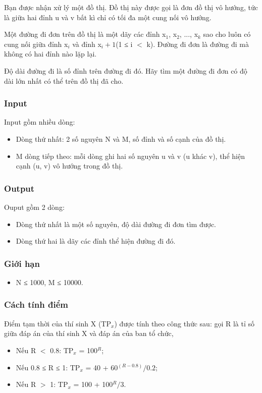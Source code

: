 

Bạn được nhận xử lý một đồ thị. Đồ thị này được gọi là đơn đồ thị vô hướng, tức là giữa hai đỉnh u và v bất kì chỉ có tối đa một cung nối vô hướng.

Một đường đi đơn trên đồ thị là một dãy các đỉnh x$_1$, x$_2$, ..., x$_k$ sao cho luôn có cung nối giữa đỉnh x$_i$ và đỉnh x$_i + 1$(1 ≤ i $<$ k). Đường đi đơn là đường đi mà không có hai đỉnh nào lặp lại.

Độ dài đường đi là số đỉnh trên đường đi đó. Hãy tìm một đường đi đơn có độ dài lớn nhất có thể trên đồ thị đã cho.

\subsubsection{Input}

Input gồm nhiều dòng:
\begin{itemize}
	\item Dòng thứ nhất: 2 số nguyên N và M, số đỉnh và số cạnh của đồ thị. 
	\item M dòng tiếp theo: mỗi dòng ghi hai số nguyên u và v (u khác v), thể hiện cạnh (u, v) vô hướng trong đồ thị.
\end{itemize}

\subsubsection{Output}

Ouput gồm 2 dòng:
\begin{itemize}
	\item Dòng thứ nhất là một số nguyên, độ dài đường đi đơn tìm được. 
	\item Dòng thứ hai là dãy các đỉnh thể hiện đường đi đó. 
\end{itemize}

\subsubsection{Giới hạn}
\begin{itemize}
	\item N ≤ 1000, M ≤ 10000.
\end{itemize}

\subsubsection{Cách tính điểm}

Điểm tạm thời của thí sinh X (TP$_x$) được tính theo công thức sau: gọi R là tỉ số giữa đáp án của thí sinh X và đáp án của ban tổ chức,
\begin{itemize}
	\item Nếu R $<$ 0.8: TP$_x$ = 100$^R$;
	\item Nếu 0.8 ≤ R ≤ 1: TP$_x$ = 40 + 60$^(R - 0.8) / 0.2$;
	\item Nếu R $>$ 1: TP$_x$ = 100 + 100$^R / 3$.
\end{itemize}

